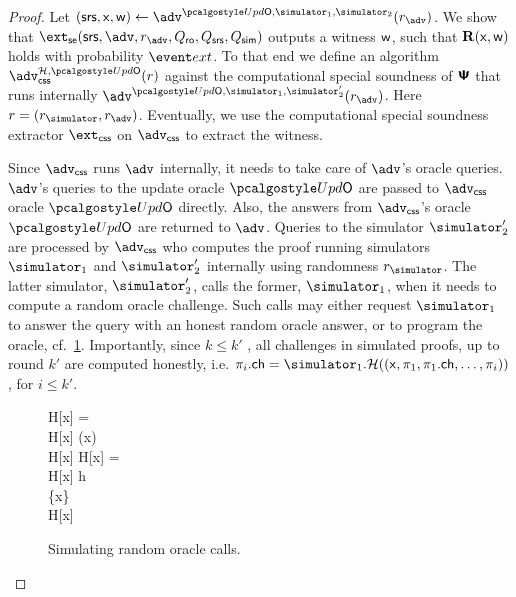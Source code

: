 \begin{proof}	
	Let $(\srs, \inp, \wit) \gets \advse^{\initU, \simulator_1, \simulator_2}(r_{\advse})$. We show that $\extse (\srs, \advse, r_{\advse}, \Qro, \Qsrs, \Qsim)$ outputs a witness $\mathsf{w}$, such that $\mathbf{R}(\mathsf{x}, \mathsf{w})$ holds with probability $\extProb$. To that end we define an algorithm $\advcss^{\ro, \initU}(r)$ against the computational special soundness of $\bm{\mathsf{\Psi}}$ that runs internally $\advse^{\initU, \simulator_1, \simulator'_2}(r_{\advse})$. Here $r = (\rsim, r_{\advse})$. Eventually, we use the computational special soundness extractor $\extcss$ on $\advcss$ to extract the witness.
	
	Since $\advcss$ runs $\advse$ internally, it needs to take care of $\advse$'s oracle queries.
	$\advse$'s queries to the update oracle $\initU$ are passed to $\advcss$ oracle $\initU$ directly. Also, the answers from $\advcss$'s oracle $\initU$ are returned to $\advse$.
	Queries to the simulator $\simulator'_2$ are processed by $\advcss$ who computes the proof running simulators $\simulator_1$ and $\simulator'_2$ internally using randomness $\rsim$. The latter simulator, $\simulator'_{2}$, calls the former, $\simulator_{1}$, when it needs to compute a random oracle challenge. Such calls may either request $\simulator_{1}$ to answer the query with an honest random oracle answer, or to program the oracle, cf.~\cref{fig:simulator_oracles}. Importantly, since $k \leq k'$ , all challenges in simulated proofs, up to round $k'$ are computed honestly, i.e. $\zkproof_{i}.\ch = \simulator_{1}.\ro((\inp, \zkproof_1, \zkproof_1.\ch, \ldots, \zkproof_{i}))$, for $i \leq k'$.
	\begin{figure}
		\centering
			\begin{pcvstack}
			\begin{pchstack}
				{
				\pcif H[x] = \bot \pcthen \\
				\pcind H[x] \gets \ro(x) \\
				\pcreturn H[x]
		  		}
				\pchspace
				{ 
					\pcif H[x] = \bot \pcthen \\ 
					\pcind H[x] \gets h \\
					\pcind \Qprog \gets \Qprog \cup \{x\}\\
					\pcreturn H[x]
				}
			\end{pchstack}
		\end{pcvstack}
		\caption{Simulating random oracle calls.}
		\label{fig:simulator_oracles}
	\end{figure}	


\end{proof}
